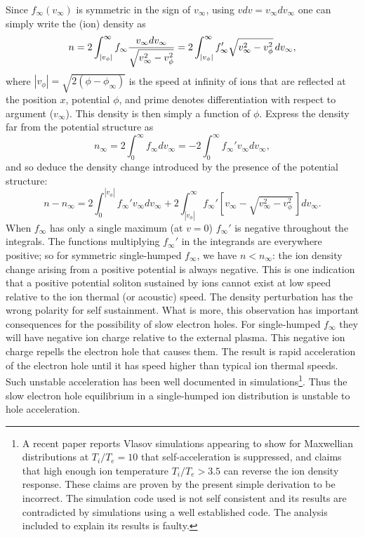 \documentclass[12pt]{article}
\begin{document}
Since $f_\infty(v_\infty)$ is symmetric in the sign of $v_\infty$,
using $vdv=v_\infty dv_\infty$ one can simply write the (ion) density
as
\begin{equation}
\label{symden}
  n = 2\int_{|v_\phi|}^\infty f_\infty {v_\infty dv_\infty\over
    \sqrt{v_\infty^2-v_\phi^2} }  
  = 2\int_{|v_\phi|}^\infty f_\infty'\sqrt{v_\infty^2-v_\phi^2}\,
  dv_\infty,
\end{equation}
where $|v_\phi|=\sqrt{2(\phi-\phi_\infty)}$ is the speed at infinity of ions that
are reflected at the position $x$, potential $\phi$, and prime denotes
differentiation with respect to argument ($v_\infty$). This density is then simply
a function of $\phi$.  Express the density far from the potential
structure as
\begin{equation}
n_\infty=2\int_0^\infty f_\infty dv_\infty=-2\int_0^\infty f_\infty'
v_\infty dv_\infty,
\end{equation}
and so deduce the density change introduced by the presence of the
potential structure:
\begin{equation}
  n-n_\infty=2\int_0^{|v_\phi|}f_\infty'v_\infty dv_\infty +
  2\int_{|v_\phi|}^{\infty}f_\infty'\left[v_\infty-\sqrt{v_\infty^2-v_\phi^2}\,\right] dv_\infty.
\end{equation}
When $f_\infty$ has only a single maximum (at $v=0$) $f_\infty'$ is
negative throughout the integrals. The functions multiplying
$f_\infty'$ in the integrands are everywhere positive; so for
symmetric single-humped $f_\infty$, we have $n<n_\infty$: the ion
density change arising from a positive potential is always
negative. This is one indication that a positive potential soliton
sustained by ions cannot exist at low speed relative to the ion
thermal (or acoustic) speed. The density perturbation has the wrong
polarity for self sustainment. What is more, this observation has
important consequences for the possibility of slow electron holes.
For single-humped $f_\infty$ they will have negative ion charge
relative to the external plasma. This negative ion charge repells
the electron
hole that causes them. The result is rapid acceleration of the
electron hole until it has speed higher than typical ion thermal
speeds. Such unstable acceleration has been well documented in
simulations\cite{Eliasson2004,Zhou2016}\footnote{A recent
  paper reports Vlasov simulations
  appearing to show for Maxwellian distributions at $T_i/T_e=10$ that
  self-acceleration is suppressed, and claims that high enough ion
  temperature $T_i/T_e>3.5$ can reverse the ion density
  response. These claims are proven by the present simple derivation
  to be incorrect.  The simulation code used is not self consistent
  and its results are contradicted by simulations using a well
  established code. The analysis included to explain its results is
  faulty.}.  Thus the slow electron hole equilibrium in a
single-humped ion distribution is unstable to hole acceleration.
\end{document}
